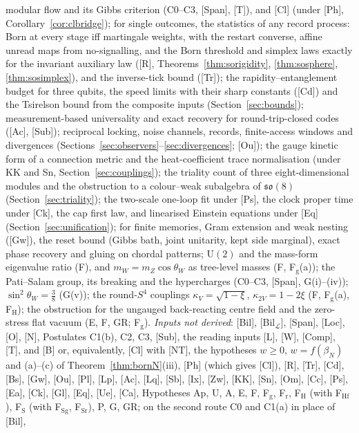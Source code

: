 \documentclass[aps,pra,onecolumn,superscriptaddress,nofootinbib,10pt]{revtex4-2}
\theoremstyle{definition}
\theoremstyle{remark}
\newcommand{\cL}{\mathcal{L}}
\newcommand{\U}{\mathrm{U}}
\begin{document}
modular flow and its Gibbs criterion (C0--C3, [Span], [T]), and [Cl] (under [Ph], Corollary~\ref{cor:clbridge}); for single
outcomes, the statistics of any record process: Born at every stage iff martingale weights, with the
restart converse, affine unread maps from no-signalling, and the Born threshold and simplex laws exactly
for the invariant auxiliary law ([R], Theorems~\ref{thm:sorigidity}, \ref{thm:sosphere}, \ref{thm:sosimplex}), and the inverse-tick
bound ([Tr]); the rapidity--entanglement budget for three qubits, the speed limits with their
sharp constants ([Cd]) and the Tsirelson bound from the composite inputs (Section~\ref{sec:bounds}); measurement-based
universality and exact recovery for round-trip-closed codes ([Ac], [Sub]); reciprocal locking, noise channels,
records, finite-access windows and divergences (Sections~\ref{sec:observers}--\ref{sec:divergences}; [Ou]); the gauge kinetic form of a connection metric and the
heat-coefficient trace normalisation (under KK and Sn, Section~\ref{sec:couplings}); the triality count of three
eight-dimensional modules and the obstruction to a colour--weak subalgebra of $\mathfrak{so}(8)$ (Section~\ref{sec:triality}); the two-scale one-loop fit
under [Ps], the clock proper time under [Ck], the cap first law, and linearised Einstein equations under
[Eq] (Section~\ref{sec:unification}); for finite memories, Gram extension and weak nesting ([Gw]), the reset bound (Gibbs bath, joint
unitarity, kept side marginal), exact phase recovery and gluing on chordal patterns; $\U(2)$ and the mass-form eigenvalue ratio (F), and $m_W=m_Z\cos\theta_W$ as tree-level masses (F, F$_{\mathrm g}$(a)); the Pati--Salam
group, its breaking and the hypercharges (C0--C3, [Span], G(i)--(iv)); $\sin^2\theta_W=\tfrac38$ (G(v));
the round-$S^4$ couplings $\kappa_V=\sqrt{1-\xi}$, $\kappa_{2V}=1-2\xi$ (F, F$_{\mathrm g}$(a), F$_{\mathrm H}$); the obstruction for the ungauged back-reacting centre field and the zero-stress flat vacuum (E, F, GR; F$_{\mathrm g}$).
\emph{Inputs not derived}: [Bil], [Bil$_\cL$], [Span], [Loc], [O], [N], Postulates C1(b), C2, C3, [Sub], the reading
inputs [L], [W], [Comp], [T], and [B] or, equivalently, [Cl] with [NT], the hypotheses $w\ge0$, $w=f(\beta_N)$ and (a)--(c) of
Theorem~\ref{thm:bornN}(iii), [Ph] (which gives [Cl]), [R], [Tr], [Cd], [Bs], [Gw], [Ou], [Pl], [Lp], [Ac], [Lq], [Sb], [Ix], [Zw], [KK], [Sn], [Om], [Cc], [Ps], [Ea], [Ck], [Gl], [Eq], [Ue], [Ca], Hypotheses Ap, U, A, E, F, F$_{\mathrm g}$, F$_{\mathrm r}$, F$_{\mathrm H}$ (with F$_{\mathrm{Hf}}$), F$_{\mathrm S}$ (with F$_{\mathrm{Sg}}$, F$_{\mathrm{Sr}}$), P, G, GR; on the second route C0 and C1(a) in place of [Bil],
\end{document}
